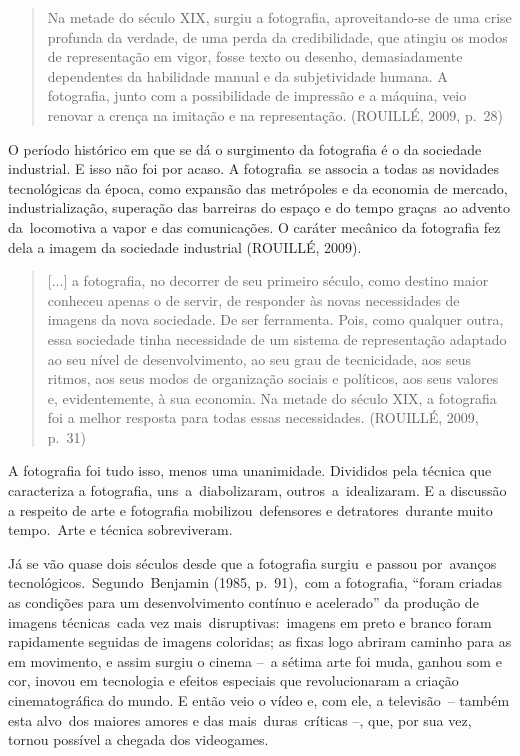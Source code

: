 \documentclass[
  letterpaper,
]{abntex2}
\begin{document}
\begin{quote}
Na metade do século XIX, surgiu a fotografia, aproveitando-se de uma
crise profunda da verdade, de uma perda da credibilidade, que atingiu os
modos de representação em vigor, fosse texto ou desenho, demasiadamente
dependentes da habilidade manual e da subjetividade humana. A
fotografia, junto com a possibilidade de impressão e a máquina, veio
renovar a crença na imitação e na representação. (ROUILLÉ, 2009, p.~28)~
\end{quote}

O período histórico em que se dá o surgimento da fotografia é o da
sociedade industrial. E isso não foi por acaso. A fotografia~se associa
a todas as novidades tecnológicas da época, como expansão das metrópoles
e da economia de mercado, industrialização, superação das barreiras do
espaço e do tempo graças~ao advento da~locomotiva a vapor e das
comunicações. O caráter mecânico da fotografia fez dela a imagem da
sociedade industrial (ROUILLÉ, 2009).~

\begin{quote}
{[}...{]} a fotografia, no decorrer de seu primeiro século, como destino
maior conheceu apenas o de servir, de responder às novas necessidades de
imagens da nova sociedade. De ser ferramenta. Pois, como qualquer outra,
essa sociedade tinha necessidade de um sistema de representação adaptado
ao seu nível de desenvolvimento, ao seu grau de tecnicidade, aos seus
ritmos, aos seus modos de organização sociais e políticos, aos seus
valores e, evidentemente, à sua economia. Na metade do século XIX, a
fotografia foi a melhor resposta para todas essas necessidades.
(ROUILLÉ, 2009, p.~31)~
\end{quote}

A fotografia foi tudo isso, menos uma unanimidade. Divididos pela
técnica que caracteriza a fotografia, uns~a~diabolizaram,
outros~a~idealizaram. E a discussão a respeito de arte e fotografia
mobilizou~defensores e detratores~durante muito tempo.~Arte e técnica
sobreviveram.~

Já se vão quase dois séculos desde que a fotografia surgiu~e passou
por~avanços tecnológicos.~Segundo~Benjamin (1985, p.~91),~com a
fotografia, ``foram criadas as condições para um desenvolvimento
contínuo e acelerado'' da produção de imagens técnicas~cada vez
mais~disruptivas:~imagens em preto e branco foram rapidamente seguidas
de imagens coloridas; as fixas logo abriram caminho para as em
movimento, e assim surgiu o cinema --~a sétima arte foi muda, ganhou som
e cor, inovou em tecnologia e efeitos especiais que revolucionaram a
criação cinematográfica do mundo. E então veio o vídeo e, com ele, a
televisão~-- também esta alvo~dos maiores amores e das
mais~duras~críticas --, que, por sua vez, tornou possível a chegada dos
videogames.
\end{document}
